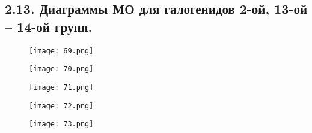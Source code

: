 


\subsection{2.13. Диаграммы МО для галогенидов 2-ой, 13-ой – 14-ой групп.} 

\par\bigskip

\begin{figure}[H]
	\centering
	{\texttt{[image: 69.png]}}
\end{figure}

\begin{figure}[H]
	\centering
	{\texttt{[image: 70.png]}}
\end{figure}
\begin{figure}[H]
	\centering
	{\texttt{[image: 71.png]}}
\end{figure}
\begin{figure}[H]
	\centering
	{\texttt{[image: 72.png]}}
\end{figure}
\begin{figure}[H]
	\centering
	{\texttt{[image: 73.png]}}
\end{figure}
\par\bigskip
\par\bigskip
